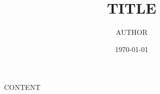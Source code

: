 \documentclass[11pt]{article}
\title{ TITLE}
\author{ AUTHOR }
\date{\today}
\begin{document}
\maketitle
\pagebreak



CONTENT

\end{document}
